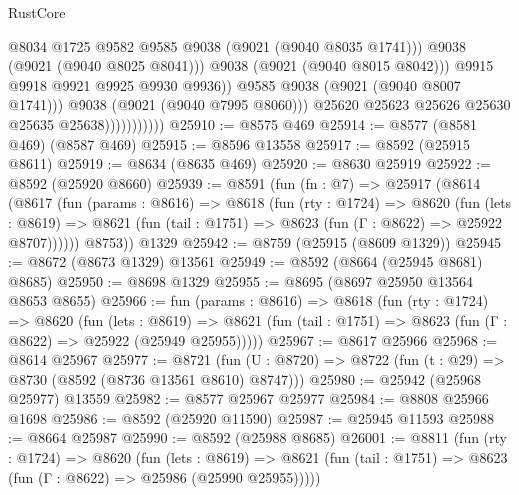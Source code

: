 \begin{lexlean}{RustCore}
\begin{coremodule}
                                        @8034
                                        @1725
                                        @9582
                                        @9585
                                        @9038
                                        (@9021 (@9040 @8035 @1741)))
                                      @9038
                                      (@9021 (@9040 @8025 @8041)))
                                    @9038
                                    (@9021 (@9040 @8015 @8042)))
                                  @9915
                                  @9918
                                  @9921
                                  @9925
                                  @9930
                                  @9936))
                              @9585
                              @9038
                              (@9021 (@9040 @8007 @1741)))
                            @9038
                            (@9021 (@9040 @7995 @8060)))
                          @25620
                          @25623
                          @25626
                          @25630
                          @25635
                          @25638)))))))))))
@25910 := @8575 @469
@25914 := @8577 (@8581 @469) (@8587 @469)
@25915 := @8596 @13558
@25917 := @8592 (@25915 @8611)
@25919 := @8634 (@8635 @469)
@25920 := @8630 @25919
@25922 := @8592 (@25920 @8660)
@25939 := @8591
    (fun (fn : @7) =>
    @25917
      (@8614
        (@8617
          (fun (params : @8616) =>
          @8618
            (fun (rty : @1724) =>
            @8620
              (fun (lets : @8619) =>
              @8621 (fun (tail : @1751) => @8623 (fun (Γ : @8622) => @25922 @8707))))))
        @8753))
    @1329
@25942 := @8759 (@25915 (@8609 @1329))
@25945 := @8672 (@8673 @1329) @13561
@25949 := @8592 (@8664 (@25945 @8681) @8685)
@25950 := @8698 @1329
@25955 := @8695 (@8697 @25950 @13564 @8653 @8655)
@25966 := fun (params : @8616) =>
  @8618
    (fun (rty : @1724) =>
    @8620
      (fun (lets : @8619) =>
      @8621 (fun (tail : @1751) => @8623 (fun (Γ : @8622) => @25922 (@25949 @25955)))))
@25967 := @8617 @25966
@25968 := @8614 @25967
@25977 := @8721
    (fun (U : @8720) => @8722 (fun (t : @29) => @8730 (@8592 (@8736 @13561 @8610) @8747)))
@25980 := @25942 (@25968 @25977) @13559
@25982 := @8577 @25967 @25977
@25984 := @8808 @25966 @1698
@25986 := @8592 (@25920 @11590)
@25987 := @25945 @11593
@25988 := @8664 @25987
@25990 := @8592 (@25988 @8685)
@26001 := @8811
    (fun (rty : @1724) =>
    @8620
      (fun (lets : @8619) =>
      @8621 (fun (tail : @1751) => @8623 (fun (Γ : @8622) => @25986 (@25990 @25955)))))

\end{coremodule}
\end{lexlean}
